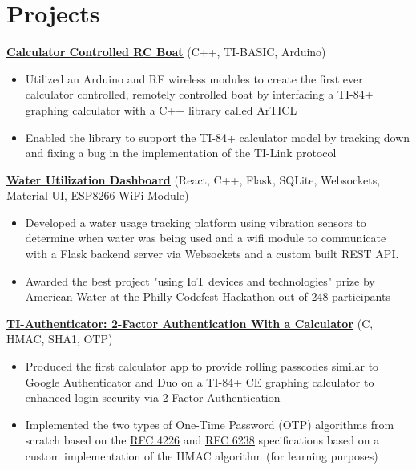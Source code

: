 \documentclass{article}
\begin{document}
\section{Projects}

\textbf{\href{https://github.com/jshin313/CalcControlledBoat}{\underline{Calculator Controlled RC Boat}}} \hfill (C++, TI-BASIC, Arduino)
\begin{itemize}
    \item Utilized an Arduino and RF wireless modules to create the first ever calculator controlled, remotely controlled boat by interfacing a TI-84+ graphing calculator with a C++ library called ArTICL
    \item Enabled the library to support the TI-84+ calculator model by tracking down and fixing a bug in the implementation of the TI-Link protocol
\end{itemize}

\textbf{\href{https://github.com/jshin313/AquaQuant}{\underline{Water Utilization Dashboard}}} \hfill (React, C++, Flask, SQLite, Websockets, Material-UI, ESP8266 WiFi Module)
\begin{itemize}
    \item Developed a water usage tracking platform using vibration sensors to determine when water was being used and a wifi module to communicate with a Flask backend server via Websockets and a custom built REST API.
    \item Awarded the best project "using IoT devices and technologies" prize by American Water at the Philly Codefest Hackathon out of 248 participants
\end{itemize}

\textbf{\href{https://github.com/jshin313/ti-authenticator}{\underline{TI-Authenticator: 2-Factor Authentication With a Calculator}}} \hfill (C, HMAC, SHA1, OTP)
\begin{itemize}
    \item Produced the first calculator app to provide rolling passcodes similar to Google Authenticator and Duo on a TI-84+ CE graphing calculator to enhanced login security via 2-Factor Authentication
    \item Implemented the two types of One-Time Password (OTP) algorithms from scratch based on the \href{https://tools.ietf.org/html/rfc4226}{\underline{RFC 4226}} and \href{https://tools.ietf.org/html/rfc6238}{\underline{RFC 6238}} specifications based on a custom implementation of the HMAC algorithm (for learning purposes)
\end{itemize}
\end{document}
